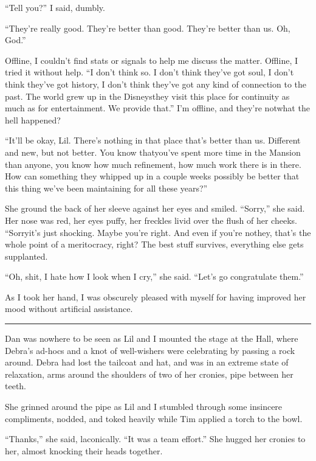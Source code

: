 “Tell you?” I said, dumbly.

“They're really good. They're better than good. They're better than
us. Oh, God.”

Offline, I couldn't find stats or signals to help me discuss the
matter. Offline, I tried it without help. “I don't think so. I
don't think they've got soul, I don't think they've got history, I
don't think they've got any kind of connection to the past. The
world grew up in the Disneys{\dash}they visit this place for continuity
as much as for entertainment. We provide that.” I'm offline, and
they're not{\dash}what the hell happened?

“It'll be okay, Lil. There's nothing in that place that's better
than us. Different and new, but not better. You know that{\dash}you've
spent more time in the Mansion than anyone, you know how much
refinement, how much work there is in there. How can something they
whipped up in a couple weeks possibly be better that this thing
we've been maintaining for all these years?”

She ground the back of her sleeve against her eyes and smiled.
“Sorry,” she said. Her nose was red, her eyes puffy, her freckles
livid over the flush of her cheeks. “Sorry{\dash}it's just shocking.
Maybe you're right. And even if you're not{\dash}hey, that's the whole
point of a meritocracy, right? The best stuff survives, everything
else gets supplanted.

“Oh, shit, I hate how I look when I cry,” she said. “Let's go
congratulate them.”

As I took her hand, I was obscurely pleased with myself for having
improved her mood without artificial assistance.

\begin{center}\rule{3in}{0.4pt}\end{center}

Dan was nowhere to be seen as Lil and I mounted the stage at the
Hall, where Debra's ad-hocs and a knot of well-wishers were
celebrating by passing a rock around. Debra had lost the tailcoat
and hat, and was in an extreme state of relaxation, arms around the
shoulders of two of her cronies, pipe between her teeth.

She grinned around the pipe as Lil and I stumbled through some
insincere compliments, nodded, and toked heavily while Tim applied
a torch to the bowl.

“Thanks,” she said, laconically. “It was a team effort.” She hugged
her cronies to her, almost knocking their heads together.

